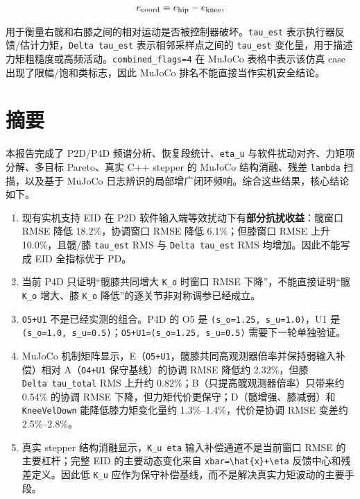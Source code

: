 \[
e_{\rm coord}=e_{\rm hip}-e_{\rm knee},
\]

用于衡量右髋和右膝之间的相对运动是否被控制器破坏。\texttt{tau\_est} 表示执行器反馈/估计力矩，\texttt{Delta\ tau\_est} 表示相邻采样点之间的 \texttt{tau\_est} 变化量，用于描述力矩粗糙度或高频活动。\texttt{combined\_flags=4} 在 MuJoCo 表格中表示该仿真 case 出现了限幅/饱和类标志，因此 MuJoCo 排名不能直接当作实机安全结论。

\section{摘要}\label{ux6458ux8981}

本报告完成了 P2D/P4D 频谱分析、恢复段统计、\texttt{eta\_u} 与软件扰动对齐、力矩项分解、多目标 Pareto、真实 C++ stepper 的 MuJoCo 结构消融、残差 \texttt{lambda} 扫描，以及基于 MuJoCo 日志辨识的局部增广闭环频响。综合这些结果，核心结论如下。

\begin{enumerate}
\def\labelenumi{\arabic{enumi}.}
\tightlist
\item
  现有实机支持 EID 在 P2D 软件输入端等效扰动下有\textbf{部分抗扰收益}：髋窗口 RMSE 降低 18.2\%，协调窗口 RMSE 降低 6.1\%；但膝窗口 RMSE 上升 10.0\%，且髋/膝 \texttt{tau\_est} RMS 与 \texttt{Delta\ tau\_est} RMS 均增加。因此不能写成 EID 全指标优于 PD。
\item
  当前 P4D 只证明``髋膝共同增大 \texttt{K\_o} 时窗口 RMSE 下降''，不能直接证明``髋 \texttt{K\_o} 增大、膝 \texttt{K\_o} 降低''的逐关节非对称调参已经成立。
\item
  \texttt{O5+U1} 不是已经实测的组合。P4D 的 O5 是 \texttt{(s\_o=1.25,\ s\_u=1.0)}，U1 是 \texttt{(s\_o=1.0,\ s\_u=0.5)}；\texttt{O5+U1=(s\_o=1.25,\ s\_u=0.5)} 需要下一轮单独验证。
\item
  MuJoCo 机制矩阵显示，E（\texttt{O5+U1}，髋膝共同高观测器倍率并保持弱输入补偿）相对 A（\texttt{O4+U1} 保守基线）的协调 RMSE 降低约 2.32\%，但膝 \texttt{Delta\ tau\_total} RMS 上升约 0.82\%；B（只提高髋观测器倍率）只带来约 0.54\% 的协调 RMSE 下降，但力矩代价更保守；D（髋增强、膝减弱）和 \texttt{KneeVelDown} 能降低膝力矩变化量约 1.3\%--1.4\%，代价是协调 RMSE 变差约 2.5\%--2.8\%。
\item
  真实 stepper 结构消融显示，\texttt{K\_u\ eta} 输入补偿通道不是当前窗口 RMSE 的主要杠杆；完整 EID 的主要动态变化来自 \texttt{xbar=\textbackslash{}hat\{x\}+\textbackslash{}eta} 反馈中心和残差定义。因此低 \texttt{K\_u} 应作为保守补偿基线，而不是解决真实力矩波动的主要手段。
\end{enumerate}


